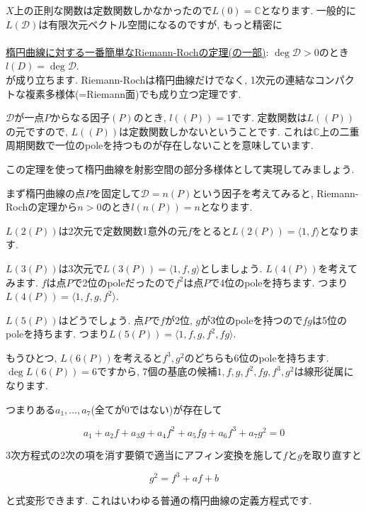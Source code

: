\documentclass{jsarticle}
\theoremstyle{definition}
\numberwithin{theorem}{section}
\begin{document}
$X$上の正則な関数は定数関数しかなかったので$L(0) = \mathbb{C}$となります. 一般的に$L(\mathcal{D})$は有限次元ベクトル空間になるのですが, もっと精密に\\\\


\underline{楕円曲線に対する一番簡単なRiemann-Rochの定理(の一部)}: $\deg \mathcal{D} > 0$のとき$l(D) = \deg \mathcal{D}$.\\

が成り立ちます. Riemann-Rochは楕円曲線だけでなく, 1次元の連結なコンパクトな複素多様体(=Riemann面)でも成り立つ定理です. 

$\mathcal{D}$が一点$P$からなる因子$(P)$のとき, $l((P)) = 1$です. 定数関数は$L((P))$の元ですので, $L((P))$は定数関数しかないということです. これは$\mathbb{C}$上の二重周期関数で一位のpoleを持つものが存在しないことを意味しています. 

この定理を使って楕円曲線を射影空間の部分多様体として実現してみましょう.

まず楕円曲線の点$P$を固定して$\mathcal{D} = n(P)$という因子を考えてみると, Riemann-Rochの定理から$n > 0$のとき$l(n(P)) = n$となります.

$L(2(P))$は2次元で定数関数1意外の元$f$をとると$L(2(P)) = \langle1, f\rangle$となります. 

$L(3(P))$は3次元で$L(3(P)) = \langle1, f, g\rangle$としましょう. $L(4(P))$を考えてみます. $f$は点$P$で2位のpoleだったので$f^2$は点$P$で4位のpoleを持ちます. つまり$L(4(P)) = \langle1, f, g, f^2\rangle$.

$L(5(P))$はどうでしょう. 点$P$で$f$が2位, $g$が3位のpoleを持つので$fg$は5位のpoleを持ちます. つまり$L(5(P)) = \langle1, f, g, f^2, fg\rangle$.

もうひとつ, $L(6(P))$を考えると$f^3, g^2$のどちらも6位のpoleを持ちます. $\deg L(6(P)) = 6$ですから, 7個の基底の候補$1, f, g, f^2, fg, f^3, g^2$は線形従属になります.

つまりある$a_1, \ldots, a_7$(全てが0ではない)が存在して

\begin{equation*}
a_1 + a_2f + a_3g + a_4f^2+a_5fg+a_6f^3+a_7g^2 = 0
\end{equation*}

3次方程式の2次の項を消す要領で適当にアフィン変換を施して$f$と$g$を取り直すと

\begin{equation}
\label{eq:elliptic_curve}
g^2 = f^3 + af + b
\end{equation}

と式変形できます. これはいわゆる普通の楕円曲線の定義方程式です.
\end{document}
